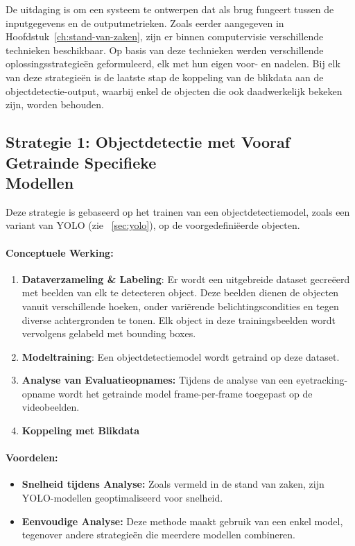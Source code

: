 De uitdaging is om een systeem te ontwerpen dat als brug fungeert tussen de inputgegevens en de outputmetrieken.
Zoals eerder aangegeven in Hoofdstuk~\ref{ch:stand-van-zaken}, zijn er binnen computervisie verschillende technieken beschikbaar.
Op basis van deze technieken werden verschillende oplossingsstrategieën geformuleerd, elk met hun eigen voor- en nadelen.
Bij elk van deze strategieën is de laatste stap de koppeling van de blikdata aan de objectdetectie-output, 
waarbij enkel de objecten die ook daadwerkelijk bekeken zijn, worden behouden.

\subsection{Strategie 1: Objectdetectie met Vooraf Getrainde Specifieke\\ Modellen}

Deze strategie is gebaseerd op het trainen van een objectdetectiemodel, zoals een variant van YOLO (zie ~\ref{sec:yolo}), 
op de voorgedefiniëerde objecten.

\paragraph{Conceptuele Werking:}
\begin{enumerate}
    \item \textbf{Dataverzameling \& Labeling}: Er wordt een uitgebreide dataset gecreëerd met beelden van elk te detecteren object. 
    Deze beelden dienen de objecten vanuit verschillende hoeken, onder variërende belichtingscondities en tegen diverse achtergronden te tonen. 
    Elk object in deze trainingsbeelden wordt vervolgens gelabeld met bounding boxes.
    \item \textbf{Modeltraining}: Een objectdetectiemodel wordt getraind op deze dataset.
    \item \textbf{Analyse van Evaluatieopnames:} Tijdens de analyse van een eyetracking-op\-name wordt het getrainde model frame-per-frame 
    toegepast op de videobeelden. 
    \item \textbf{Koppeling met Blikdata}
\end{enumerate}

\paragraph{Voordelen:}
\begin{itemize}
    \item \textbf{Snelheid tijdens Analyse:} Zoals vermeld in de stand van zaken, zijn YOLO-modellen geoptimaliseerd voor snelheid.
    \item \textbf{Eenvoudige Analyse:} Deze methode maakt gebruik van een enkel model, tegenover andere strategieën die meerdere modellen combineren.
\end{itemize}

